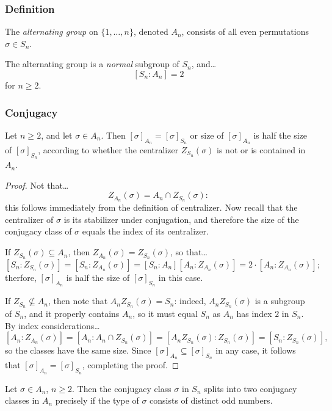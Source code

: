 \subsubsection{Definition}
The \emph{alternating group} on $\{1, \dots, n \}$, denoted $A_n$, consists of all even permutations $\sigma \in S_n$. \newline

\noindent The alternating group is a \emph{normal} subgroup of $S_n$, and\dots
$$[S_n : A_n] = 2$$
for $n \geq 2$.

\subsubsection{Conjugacy}\label{conjugacyalternatinggroup}

\begin{lemma}
Let $n \geq 2$, and let $\sigma \in A_n$. Then $[\sigma]_{A_n} = [\sigma]_{S_n}$ or size of $[\sigma]_{A_n}$ is half the size of $[\sigma]_{S_n}$, according to whether
the centralizer $Z_{S_n}(\sigma)$ is not or is contained in $A_n$.
\end{lemma}

\begin{proof}
Not that\dots
$$Z_{A_n}(\sigma) = A_n \cap Z_{S_n}(\sigma):$$
this follows immediately from the definition of centralizer. Now recall that the centralizer of $\sigma$ is its stabilizer under conjugation, and therefore the size of the conjugacy
class of $\sigma$ equals the index of its centralizer.

If $Z_{S_n}(\sigma) \subseteq A_n$, then $Z_{A_n}(\sigma) = Z_{S_n}(\sigma)$, so that\dots
$$[S_n : Z_{S_n}(\sigma)] = [S_n : Z_{A_n}(\sigma)] = [S_n :A_n][A_n : Z_{A_n}(\sigma)] = 2 \cdot [A_n : Z_{A_n}(\sigma)];$$
therfore, $[\sigma]_{A_n}$ is half the size of $[\sigma]_{S_n}$ in this case.

If $Z_{S_n} \not \subseteq A_n$, then note that $A_nZ_{S_n}(\sigma) = S_n$: indeed, $A_nZ_{S_n}(\sigma)$ is a subgroup of $S_n$, and it properly contains $A_n$, so
it must equal $S_n$ as $A_n$ has index $2$ in $S_n$. By index considerations\dots
$$[A_n : Z_{A_n}(\sigma)] = [A_n : A_n \cap Z_{S_n}(\sigma)] = [A_nZ_{S_n}(\sigma) : Z_{S_n}(\sigma)] = [S_n : Z_{S_n}(\sigma)],$$
so the classes have the same size. Since $[\sigma]_{A_n} \subseteq [\sigma]_{S_n}$ in any case, it follows that $[\sigma]_{A_n} = [\sigma]_{S_n}$, completing the proof.
\end{proof}

\begin{proposition}
\label{conjugacyclassofalternatinggroup}
Let $\sigma \in A_n$, $n \geq 2$. Then the conjugacy class $\sigma$ in $S_n$ splits into two conjugacy classes in $A_n$ precisely if the type of $\sigma$
consists of distinct odd numbers.
\end{proposition}

